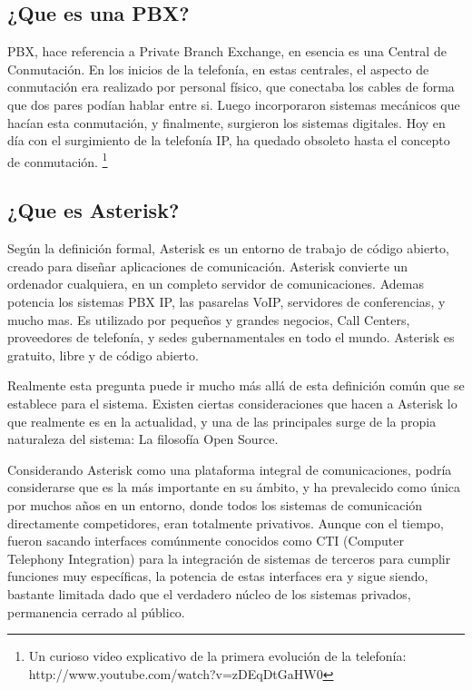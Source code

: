 \subsection{¿Que es una PBX?}

PBX, hace referencia a Private Branch Exchange, en esencia es una Central de Conmutación. En los inicios de la telefonía, en estas centrales, el aspecto de conmutación era realizado por personal físico, que conectaba los cables de forma que dos pares podían hablar entre si. Luego incorporaron sistemas mecánicos que hacían esta conmutación, y finalmente, surgieron los sistemas digitales. Hoy en día con el surgimiento de la telefonía IP, ha quedado obsoleto hasta el concepto de conmutación. \footnote{Un curioso video explicativo de la primera evolución de la telefonía: http://www.youtube.com/watch?v=zDEqDtGaHW0}

\subsection{¿Que es Asterisk?}

Según la definición formal, Asterisk es un entorno de trabajo de código abierto, creado para diseñar aplicaciones de comunicación. Asterisk convierte un ordenador cualquiera, en un completo servidor de comunicaciones. Ademas potencia los sistemas PBX IP, las pasarelas VoIP, servidores de conferencias, y mucho mas. Es utilizado por pequeños y grandes negocios, Call Centers, proveedores de telefonía, y sedes gubernamentales en todo el mundo. Asterisk es gratuito, libre y de código abierto.

Realmente esta pregunta puede ir mucho más allá de esta definición común que se establece para el sistema. Existen ciertas consideraciones que hacen a Asterisk lo que realmente es en la actualidad, y una de las principales surge de la propia naturaleza del sistema: La filosofía Open Source.

Considerando Asterisk como una plataforma integral de comunicaciones, podría considerarse que es la más importante en su ámbito, y ha prevalecido como única por muchos años en un entorno, donde todos los sistemas de comunicación directamente competidores, eran totalmente privativos. Aunque con el tiempo, fueron sacando interfaces comúnmente conocidos como CTI (Computer Telephony Integration) para la integración de sistemas de terceros para cumplir funciones muy específicas, la potencia de estas interfaces era y sigue siendo, bastante limitada dado que el verdadero núcleo de los sistemas privados, permanencia cerrado al público.

